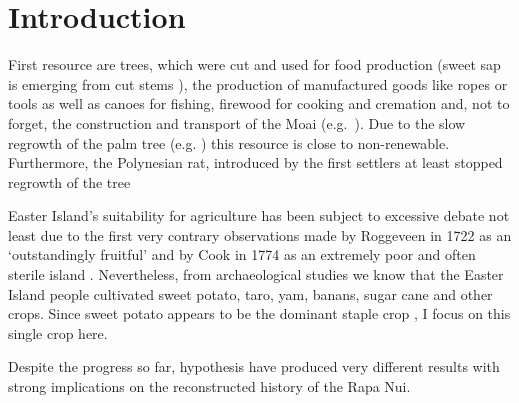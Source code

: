 
\section{Introduction}


First resource are trees, which were cut and used for food production (sweet sap is emerging from cut stems \citet{Mieth2015}), the production of manufactured goods like ropes or tools as well as canoes for fishing, firewood for cooking and cremation and, not to forget, the construction and transport of the Moai (e.g.\ \citet{Diamond2011}). Due to the slow regrowth of the palm tree (e.g. \citet{Brander1998}) this resource is close to non-renewable. Furthermore, the Polynesian rat, introduced by the first settlers at least stopped regrowth of the tree






Easter Island's suitability for agriculture has been subject to excessive debate not least due to the first very contrary observations made by Roggeveen in 1722 as an `outstandingly fruitful' and by Cook in 1774 as an extremely poor and often sterile island \citep{Bahn2017}. %
Nevertheless, from archaeological studies we know that the Easter Island people cultivated sweet potato, taro, yam, banans, sugar cane and other crops.
Since sweet potato appears to be the dominant staple crop \citep{Louwagie2006}, I focus on this single crop here.

Despite the progress so far, hypothesis  have produced very different results with strong implications on the reconstructed history of the Rapa Nui.